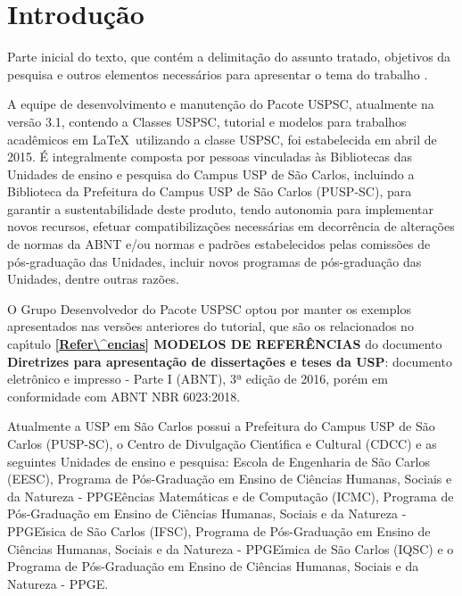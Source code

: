
\chapter[Introdu\c{c}\~ao]{Introdu\c{c}\~ao}
\label{Introdu\c{c}\~ao}

Parte inicial do texto, que cont\'em a delimita\c{c}\~ao do assunto tratado, objetivos da pesquisa e outros elementos necess\'arios para apresentar o tema do trabalho \cite{aguia2020}.

A equipe de desenvolvimento e manuten\c{c}\~ao do Pacote USPSC, atualmente na vers\~ao 3.1, contendo a Classes USPSC, tutorial e modelos para trabalhos acad\^emicos em \LaTeX\ utilizando a classe USPSC, foi estabelecida em abril de 2015. \'E integralmente composta por pessoas vinculadas \`as Bibliotecas das Unidades de ensino e pesquisa do Campus USP de S\~ao Carlos, incluindo a Biblioteca da Prefeitura do Campus USP de S\~ao Carlos (PUSP-SC), para garantir a sustentabilidade deste produto, tendo autonomia para implementar novos recursos, efetuar compatibiliza\c{c}\~oes necess\'arias em decorr\^encia de altera\c{c}\~oes de normas da ABNT e/ou normas e padr\~oes estabelecidos pelas comiss\~oes de p\'os-gradua\c{c}\~ao das Unidades, incluir novos programas de p\'os-gradua\c{c}\~ao das Unidades, dentre outras raz\~oes.

O Grupo Desenvolvedor do Pacote USPSC optou por manter os exemplos apresentados nas vers\~oes anteriores do tutorial, que s\~ao os relacionados no cap\'{\i}tulo \textbf{\ref{Refer\^encias} MODELOS DE REFER\^ENCIAS} do documento \textbf{Diretrizes para apresenta\c{c}\~ao de disserta\c{c}\~oes e teses da USP}: documento eletr\^onico e impresso - Parte I (ABNT), 3ª edi\c{c}\~ao de 2016, por\'em em conformidade com ABNT NBR 6023:2018. 

Atualmente a USP em S\~ao Carlos possui a Prefeitura do Campus USP de S\~ao Carlos (PUSP-SC), o Centro de Divulga\c{c}\~ao Cient\'{\i}fica e Cultural (CDCC) e as seguintes Unidades de ensino e pesquisa: Escola de Engenharia de S\~ao Carlos (EESC), Programa de P\'os-Gradua\c{c}\~ao em Ensino de Ci\^encias Humanas, Sociais e da Natureza - PPGE\^encias Matem\'aticas e de Computa\c{c}\~ao (ICMC), Programa de P\'os-Gradua\c{c}\~ao em Ensino de Ci\^encias Humanas, Sociais e da Natureza - PPGE\'{\i}sica de S\~ao Carlos (IFSC), Programa de P\'os-Gradua\c{c}\~ao em Ensino de Ci\^encias Humanas, Sociais e da Natureza - PPGE\'{\i}mica de S\~ao Carlos (IQSC) e o Programa de P\'os-Gradua\c{c}\~ao em Ensino de Ci\^encias Humanas, Sociais e da Natureza - PPGE.

